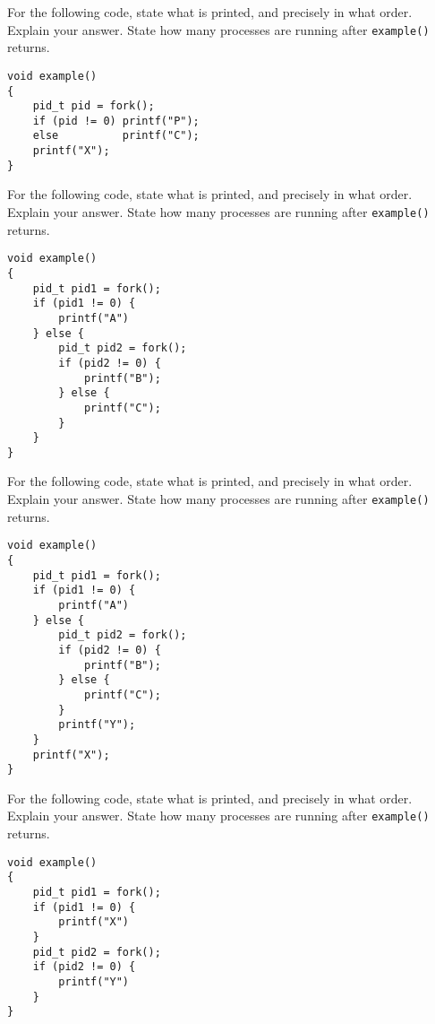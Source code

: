 \frmrule

\begin{example}
For the following code, state what is printed, and precisely in what order.
Explain your answer. State how many processes are running 
after \lstinline{example()} returns.
\begin{lstlisting}
void example()
{
	pid_t pid = fork();
	if (pid != 0) printf("P");
	else          printf("C");
	printf("X");
}
\end{lstlisting}
\end{example}

\frmrule


\begin{example}
For the following code, state what is printed, and precisely in what order.
Explain your answer. State how many processes are running 
after \lstinline{example()} returns.
\begin{lstlisting}
void example()
{
	pid_t pid1 = fork();
	if (pid1 != 0) {
		printf("A")
	} else {
		pid_t pid2 = fork();
		if (pid2 != 0) {
			printf("B");
		} else {
			printf("C");
		}
	} 
}
\end{lstlisting}
\end{example}


\frmrule

\begin{example}
For the following code, state what is printed, and precisely in what order.
Explain your answer. State how many processes are running 
after \lstinline{example()} returns.
\begin{lstlisting}
void example()
{
	pid_t pid1 = fork();
	if (pid1 != 0) {
		printf("A")
	} else {
		pid_t pid2 = fork();
		if (pid2 != 0) {
			printf("B");
		} else {
			printf("C");
		}
		printf("Y");
	} 
	printf("X");
}
\end{lstlisting}
\end{example}

\frmrule

\begin{example}
For the following code, state what is printed, and precisely in what order.
Explain your answer. State how many processes are running 
after \lstinline{example()} returns.
\begin{lstlisting}
void example()
{
	pid_t pid1 = fork();
	if (pid1 != 0) {
		printf("X")
	}
	pid_t pid2 = fork();
	if (pid2 != 0) {
		printf("Y")
	}
}
\end{lstlisting}
\end{example}

\frmrule

